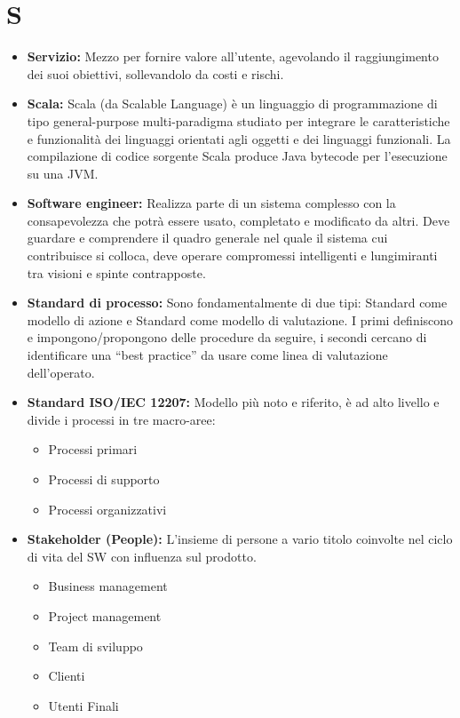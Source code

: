 \documentclass[a4paper]{report}
\newcommand{\mychapter}[2]{
	\setcounter{chapter}{#1}
	\setcounter{section}{0}
	\setcounter{subsection}{1}
	\chapter*{#2}
	\addcontentsline{toc}{chapter}{#2}
}
\begin{document}
	\mychapter{16}{S}
		\begin{itemize}
			\item \textbf{Servizio:} Mezzo per fornire valore all'utente, agevolando il raggiungimento dei suoi obiettivi, 
			sollevandolo da costi e rischi.
			\item \textbf{Scala:} Scala (da Scalable Language) è un linguaggio di programmazione di tipo general-purpose
			 multi-paradigma studiato per integrare le caratteristiche e funzionalità dei linguaggi orientati agli oggetti e dei linguaggi
			  funzionali. La compilazione di codice sorgente Scala produce Java bytecode per l'esecuzione su una JVM.
			\item \textbf{Software engineer:} Realizza parte di un sistema complesso con la consapevolezza che potrà essere 
			usato, completato e modificato da altri. Deve guardare e comprendere il quadro generale nel quale il sistema cui 
			contribuisce si colloca, deve operare compromessi intelligenti e lungimiranti tra visioni e spinte contrapposte.
			\item \textbf{Standard di processo:} Sono fondamentalmente di due tipi: Standard come modello di azione e Standard 
			come modello di valutazione. I primi definiscono e impongono/propongono delle procedure da seguire, i secondi 
			cercano di identificare una “best practice” da usare come linea di valutazione dell’operato.
			\item \textbf{Standard ISO/IEC 12207:} Modello più noto e riferito, è ad alto livello e divide i processi in tre 
			macro-aree:
			\begin{itemize}
				\item  Processi primari
			  	\item  Processi di supporto
			  	\item  Processi organizzativi
			\end{itemize}
			\item \textbf{Stakeholder (People):} L’insieme di persone a vario titolo coinvolte nel ciclo di vita del SW con 
			influenza sul prodotto.
			\begin{itemize}
				\item  Business management
			  	\item  Project management
			  	\item  Team di sviluppo
			  	\item  Clienti
			  	\item  Utenti Finali
			\end{itemize}
		\end{itemize}
		
\end{document}
